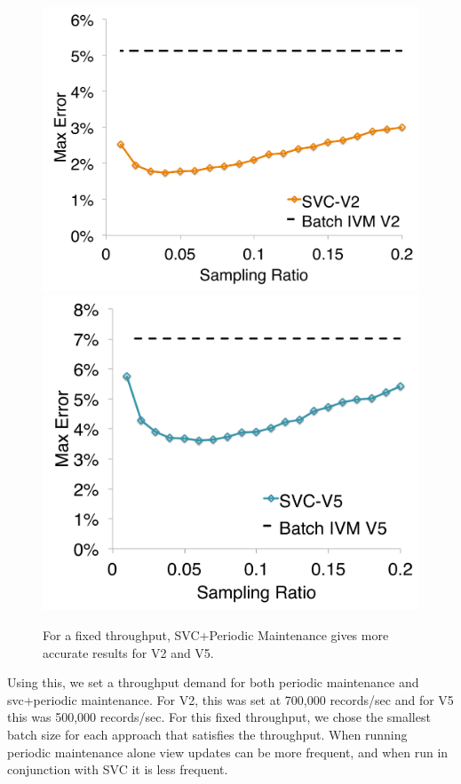\begin{figure}[t]
\centering
 \includegraphics[scale=0.14]{exp/con_5.pdf}
 \includegraphics[scale=0.14]{exp/con_6.pdf}
 \caption{For a fixed throughput, SVC+Periodic Maintenance gives more accurate results for V2 and V5. \label{conv-4}} 
\end{figure}

Using this, we set a throughput demand for both periodic maintenance and svc+periodic maintenance. 
For V2, this was set at 700,000 records/sec and for V5 this was 500,000 records/sec.
For this fixed throughput, we chose the smallest batch size for each approach that satisfies the throughput.
When running periodic maintenance alone view updates can be more frequent, and when run in conjunction with SVC it is less frequent. 


